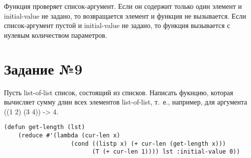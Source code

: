 Функция проверяет список-аргумент. Если он содержит только один элемент и
initial-value не задано, то возвращается элемент и функция не вызывается.
Если список-аргумент пустой и initial-value не задано, то функция вызывается с
нулевым количеством параметров.

\section{Задание №9}

Пусть list-of-list список, состоящий из списков. Написать фукнцию, которая
вычисляет сумму длин всех элементов list-of-list, т.~е., например, для
аргумента ((1 2) (3 4)) -> 4.

\vspace{4mm}
\begin{minipage}{0.92\linewidth}
\begin{lstlisting}
(defun get-length (lst)
    (reduce #'(lambda (cur-len x) 
                   (cond ((listp x) (+ cur-len (get-length x)))
                         (T (+ cur-len 1)))) lst :initial-value 0))
\end{lstlisting}
\end{minipage}

